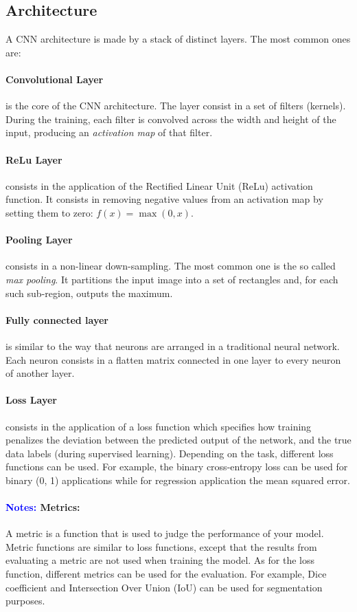 \documentclass{standalone}
\begin{document}
\subsection{Architecture}

A CNN architecture is made by a stack of distinct layers.
The most common ones are:

\paragraph{Convolutional Layer} is the core of the CNN architecture.
The layer consist in a set of filters (kernels).
During the training, each filter is convolved across the width and height of the input, producing an \textit{activation map} of that filter\cite{wiki:cnn, CNN}. 

\paragraph{ReLu Layer}
consists in the application of the Rectified Linear Unit (ReLu) activation function. 
It consists in removing negative values from an activation map by setting them to zero: $f(x)= \max (0, x)$.

\paragraph{Pooling Layer}
consists in a non-linear down-sampling.
The most common one is the so called \textit{max pooling}\cite{wiki:cnn}.
It partitions the input image into a set of rectangles and, for each such sub-region, outputs the maximum.

\paragraph{Fully connected layer}
is similar to the way that neurons are arranged in a traditional neural network.
Each neuron consists in a flatten matrix connected in one layer to every neuron of another layer.


\paragraph{Loss Layer}
consists in the application of a loss function which specifies how training penalizes the deviation between the predicted output of the network, and the true data labels (during supervised learning).
Depending on the task, different loss functions can be used.
For example, the binary cross-entropy loss can be used for binary (0, 1) applications while for regression application the mean squared error.

\paragraph{\textcolor{blue}{Notes:} Metrics:} 
A metric is a function that is used to judge the performance of your model.
Metric functions are similar to loss functions, except that the results from evaluating a metric are not used when training the model.
As for the loss function, different metrics can be used for the evaluation.
For example, Dice coefficient and Intersection Over Union (IoU) can be used for segmentation purposes.
\end{document}
